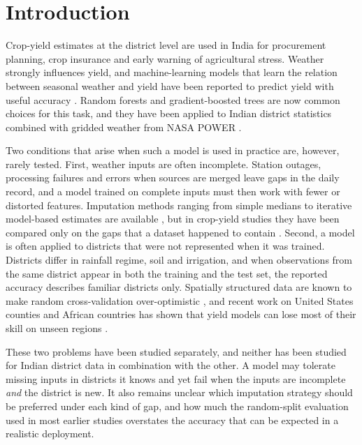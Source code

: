 \section{Introduction}

Crop-yield estimates at the district level are used in India for procurement planning, crop
insurance and early warning of agricultural stress. Weather strongly influences yield, and
machine-learning models that learn the relation between seasonal weather and yield have been
reported to predict yield with useful accuracy \cite{vanklompenburg2020,jeong2016,khaki2019}.
Random forests and gradient-boosted trees are now common choices for this task, and they have
been applied to Indian district statistics combined with gridded weather from NASA POWER
\cite{alsaber2025,manogna2026}.

Two conditions that arise when such a model is used in practice are, however, rarely tested.
First, weather inputs are often incomplete. Station outages, processing failures and errors
when sources are merged leave gaps in the daily record, and a model trained on complete inputs
must then work with fewer or distorted features. Imputation methods ranging from simple medians
to iterative model-based estimates are available \cite{little2019,troyanskaya2001,vanbuuren2011},
but in crop-yield studies they have been compared only on the gaps that a dataset happened to
contain \cite{saini2024,calin2023}. Second, a model is often applied to districts that were not
represented when it was trained. Districts differ in rainfall regime, soil and irrigation, and
when observations from the same district appear in both the training and the test set, the
reported accuracy describes familiar districts only. Spatially structured data are known to make
random cross-validation over-optimistic \cite{roberts2017,meyer2019,ploton2020}, and recent work on
United States counties and African countries has shown that yield models can lose most of their
skill on unseen regions \cite{chakravarty2026,adjei2026}.

These two problems have been studied separately, and neither has been studied for Indian
district data in combination with the other. A model may tolerate missing inputs in districts
it knows and yet fail when the inputs are incomplete \emph{and} the district is new. It also
remains unclear which imputation strategy should be preferred under each kind of gap, and how
much the random-split evaluation used in most earlier studies overstates the accuracy that can
be expected in a realistic deployment.

